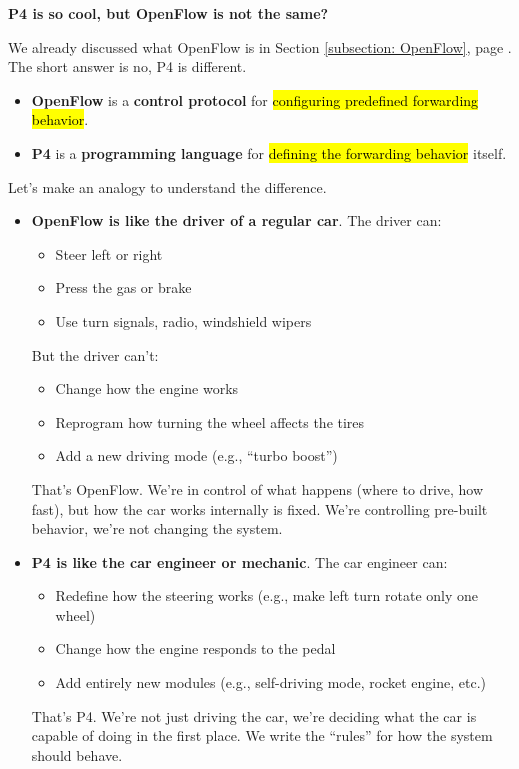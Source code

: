 \highspace
\begin{flushleft}
    \textcolor{Green3}{ \textbf{P4 is so cool, but OpenFlow is not the same?}}
\end{flushleft}
We already discussed what OpenFlow is in Section \ref{subsection: OpenFlow}, page \pageref{subsection: OpenFlow}. The short answer is no, P4 is different.
\begin{itemize}
    \item \textbf{OpenFlow} is a \textbf{control protocol} for \hl{configuring predefined forwarding behavior}.
    \item \textbf{P4} is a \textbf{programming language} for \hl{defining the forwarding behavior} itself.
\end{itemize}

\highspace
Let's make an analogy to understand the difference.
\begin{itemize}
    \item \textbf{OpenFlow is like the driver of a regular car}. The driver can:
    \begin{itemize}
        \item[\textcolor{Green3}{\faIcon{check}}] Steer left or right
        \item[\textcolor{Green3}{\faIcon{check}}] Press the gas or brake
        \item[\textcolor{Green3}{\faIcon{check}}] Use turn signals, radio, windshield wipers
    \end{itemize}
    But the driver can't:
    \begin{itemize}
        \item[\textcolor{Red2}{\faIcon{times}}] Change how the engine works
        \item[\textcolor{Red2}{\faIcon{times}}] Reprogram how turning the wheel affects the tires
        \item[\textcolor{Red2}{\faIcon{times}}] Add a new driving mode (e.g., ``turbo boost'')
    \end{itemize}
    That's OpenFlow. We're in control of what happens (where to drive, how fast), but how the car works internally is fixed. We're controlling pre-built behavior, we're not changing the system.

    \item \textbf{P4 is like the car engineer or mechanic}. The car engineer can:
    \begin{itemize}
        \item[\textcolor{Green3}{\faIcon{check}}] Redefine how the steering works (e.g., make left turn rotate only one wheel)
        \item[\textcolor{Green3}{\faIcon{check}}] Change how the engine responds to the pedal
        \item[\textcolor{Green3}{\faIcon{check}}] Add entirely new modules (e.g., self-driving mode, rocket engine, etc.)
    \end{itemize}
    That's P4. We're not just driving the car, we're deciding what the car is capable of doing in the first place. We write the ``rules'' for how the system should behave.
\end{itemize}

